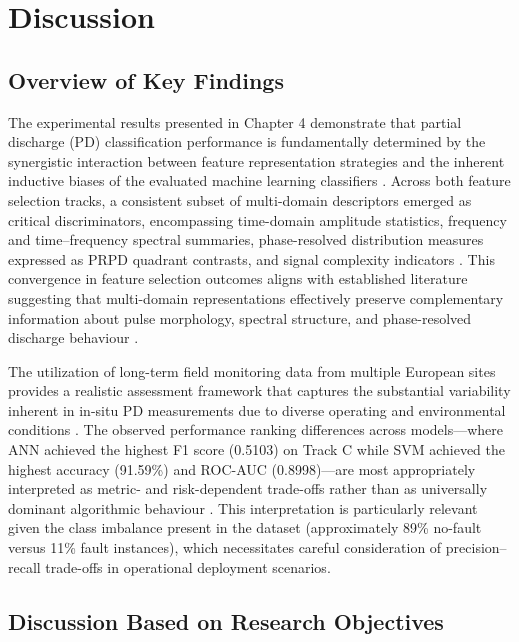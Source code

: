 \chapter{Discussion}

\section{Overview of Key Findings}

The experimental results presented in Chapter 4 demonstrate that partial discharge (PD) classification performance is fundamentally determined by the synergistic interaction between feature representation strategies and the inherent inductive biases of the evaluated machine learning classifiers \parencite{Aldosari_2023, Srivastava_2023_1}. Across both feature selection tracks, a consistent subset of multi-domain descriptors emerged as critical discriminators, encompassing time-domain amplitude statistics, frequency and time--frequency spectral summaries, phase-resolved distribution measures expressed as PRPD quadrant contrasts, and signal complexity indicators \parencite{Zhang_2024_28, Seitz_2024_1}. This convergence in feature selection outcomes aligns with established literature suggesting that multi-domain representations effectively preserve complementary information about pulse morphology, spectral structure, and phase-resolved discharge behaviour \parencite{Orellana_2023_1, Long_2024}.

The utilization of long-term field monitoring data from multiple European sites provides a realistic assessment framework that captures the substantial variability inherent in in-situ PD measurements due to diverse operating and environmental conditions \parencite{Florkowski_2024, Sikorski_2025}. The observed performance ranking differences across models—where ANN achieved the highest F1 score (0.5103) on Track C while SVM achieved the highest accuracy (91.59\%) and ROC-AUC (0.8998)—are most appropriately interpreted as metric- and risk-dependent trade-offs rather than as universally dominant algorithmic behaviour \parencite{Zemouri_2023_1, Adhikari_2024}. This interpretation is particularly relevant given the class imbalance present in the dataset (approximately 89\% no-fault versus 11\% fault instances), which necessitates careful consideration of precision--recall trade-offs in operational deployment scenarios.

\section{Discussion Based on Research Objectives}


